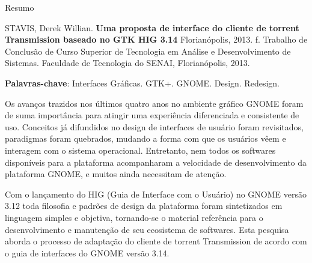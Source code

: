 Resumo %

\noindent STAVIS, Derek Willian. \textbf{Uma proposta de interface do cliente
de torrent Transmission baseado no GTK HIG 3.14} Florianópolis, 2013.
\pageref{nropaginas}f. Trabalho de Conclusão de Curso Superior de Tecnologia
em Análise e Desenvolvimento de Sistemas. Faculdade de Tecnologia do SENAI,
Florianópolis, 2013.

\vspace{1cm}
\setlength{\absparsep}{18pt} %
\begin{resumo}

 \textbf{Palavras-chave}: Interfaces Gráficas. GTK+. GNOME. Design. Redesign.
 
  Os avanços trazidos nos últimos quatro anos no ambiente gráfico GNOME foram de
  suma importância para atingir uma experiência diferenciada e consistente de
  uso. Conceitos já difundidos no design de interfaces de usuário foram
  revisitados, paradigmas foram quebrados, mudando a forma com que os usuários
  vêem e interagem com o sistema operacional. Entretanto, nem todos os softwares
  disponíveis para a plataforma acompanharam a velocidade de desenvolvimento da
  plataforma GNOME, e muitos ainda necessitam de atenção.
  
  Com o lançamento do HIG (Guia de Interface com o Usuário) no GNOME versão 3.12
  toda filosofia e padrões de design da plataforma foram sintetizados em
  linguagem simples e objetiva, tornando-se o material referência para o
  desenvolvimento e manutenção de seu ecosistema de softwares. Esta pesquisa
  aborda o processo de adaptação do cliente de torrent Transmission de acordo
  com o guia de interfaces do GNOME versão 3.14.

 
\end{resumo}
